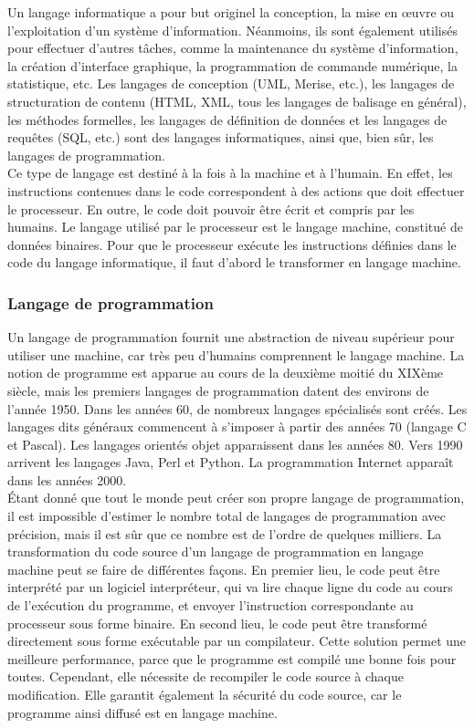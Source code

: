 Un langage informatique a pour but originel la conception, la mise en œuvre ou l’exploitation d’un système d’information. Néanmoins, ils sont également utilisés pour effectuer d’autres tâches, comme la maintenance du système d’information, la création d’interface graphique, la programmation de commande numérique, la statistique, etc. Les langages de conception (UML, Merise, etc.), les langages de structuration de contenu (HTML, XML, tous les langages de balisage en général), les méthodes formelles, les langages de définition de données et les langages de requêtes (SQL, etc.) sont des langages informatiques, ainsi que, bien sûr, les langages de programmation.\\

Ce type de langage est destiné à la fois à la machine et à l’humain. En effet, les instructions contenues dans le code correspondent à des actions que doit effectuer le processeur. \cite{bib_infoclick} En outre, le code doit pouvoir être écrit et compris par les humains. Le langage utilisé par le processeur est le langage machine, constitué de données binaires. Pour que le processeur exécute les instructions définies dans le code du langage informatique, il faut d’abord le transformer en langage machine.

\subsubsection{Langage de programmation}

Un langage de programmation fournit une abstraction de niveau supérieur pour utiliser une machine, car très peu d’humains comprennent le langage machine. La notion de programme est apparue au cours de la deuxième moitié du XIXème siècle, mais les premiers langages de programmation datent des environs de l’année 1950. Dans les années 60, de nombreux langages spécialisés sont créés. Les langages dits généraux commencent à s’imposer à partir des années 70 (langage C et Pascal). Les langages orientés objet apparaissent dans les années 80. Vers 1990 arrivent les langages Java, Perl et Python. \cite{bib_knuth} La programmation Internet apparaît dans les années 2000.\\

Étant donné que tout le monde peut créer son propre langage de programmation, il est impossible d’estimer le nombre total de langages de programmation avec précision, mais il est sûr que ce nombre est de l’ordre de quelques milliers. \cite{bib_scriptol} \cite{bib_dowek} La transformation du code source d’un langage de programmation en langage machine peut se faire de différentes façons. En premier lieu, le code peut être interprété par un logiciel interpréteur, qui va lire chaque ligne du code au cours de l’exécution du programme, et envoyer l’instruction correspondante au processeur sous forme binaire. En second lieu, le code peut être transformé directement sous forme exécutable par un compilateur. Cette solution permet une meilleure performance, parce que le programme est compilé une bonne fois pour toutes. Cependant, elle nécessite de recompiler le code source à chaque modification. Elle garantit également la sécurité du code source, car le programme ainsi diffusé est en langage machine.\\

